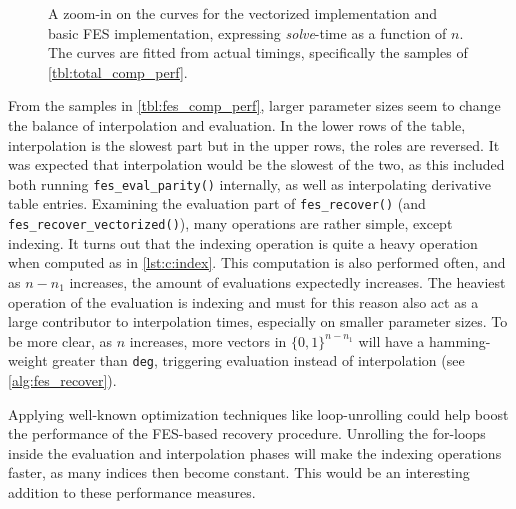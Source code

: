 \begin{figure}[t]
    \centering
    \caption{A zoom-in on the curves for the vectorized implementation and basic FES implementation, expressing \textit{solve}-time as a function of $n$. The curves are fitted from actual timings, specifically the samples of \cref{tbl:total_comp_perf}.} \label{fig:time_avx_fes}
\end{figure}
From the samples in \cref{tbl:fes_comp_perf}, larger parameter sizes seem to change the balance of interpolation and evaluation. In the lower rows of the table, interpolation is the slowest part but in the upper rows, the roles are reversed. It was expected that interpolation would be the slowest of the two, as this included both running \texttt{fes\_eval\_parity()} internally, as well as interpolating derivative table entries. Examining the evaluation part of \texttt{fes\_recover()} (and \texttt{fes\_recover\_vectorized()}), many operations are rather simple, except indexing. It turns out that the indexing operation is quite a heavy operation when computed as in \cref{lst:c:index}. This computation is also performed often, and as $n - n_1$ increases, the amount of evaluations expectedly increases. The heaviest operation of the evaluation is indexing and must for this reason also act as a large contributor to interpolation times, especially on smaller parameter sizes. To be more clear, as $n$ increases, more vectors in $\{0,1\}^{n - n_1}$ will have a hamming-weight greater than \texttt{deg}, triggering evaluation instead of interpolation (see \cref{alg:fes_recover}).

Applying well-known optimization techniques like loop-unrolling could help boost the performance of the FES-based recovery procedure. Unrolling the for-loops inside the evaluation and interpolation phases will make the indexing operations faster, as many indices then become constant. This would be an interesting addition to these performance measures.

